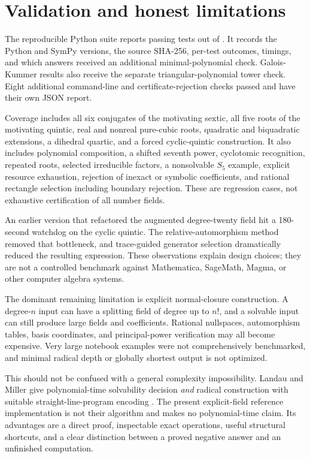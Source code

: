 \documentclass[11pt,a4paper]{article}
\theoremstyle{definition}\newtheorem{definition}[theorem]{Definition}
\theoremstyle{remark}\newtheorem{remark}[theorem]{Remark}
\begin{document}
\section{Validation and honest limitations}
The reproducible Python suite reports \TestPassed{} passing tests out of
\TestCount{}. It records the Python and SymPy versions, the source SHA-256,
per-test outcomes, timings, and which answers received an additional
minimal-polynomial check. Galois-Kummer results also receive the separate
triangular-polynomial tower check. Eight additional command-line and
certificate-rejection checks passed and have their own JSON report.

Coverage includes all six conjugates of the motivating sextic, all five
roots of the motivating quintic, real and nonreal pure-cubic roots, quadratic
and biquadratic extensions, a dihedral quartic, and a forced cyclic-quintic
construction. It also includes polynomial composition, a shifted seventh
power, cyclotomic recognition, repeated roots, selected irreducible factors,
a nonsolvable $S_5$ example, explicit resource exhaustion, rejection of
inexact or symbolic coefficients, and rational rectangle selection including
boundary rejection. These are regression cases, not exhaustive certification
of all number fields.

An earlier version that refactored the augmented degree-twenty field hit a
180-second watchdog on the cyclic quintic. The relative-automorphism method
removed that bottleneck, and trace-guided generator selection dramatically
reduced the resulting expression. These observations explain design choices;
they are not a controlled benchmark against Mathematica, SageMath, Magma,
or other computer algebra systems.

The dominant remaining limitation is explicit normal-closure construction.
A degree-$n$ input can have a splitting field of degree up to $n!$, and a
solvable input can still produce large fields and coefficients. Rational
nullspaces, automorphism tables, basis coordinates, and principal-power
verification may all become expensive. Very large notebook examples were
not comprehensively benchmarked, and minimal radical depth or globally
shortest output is not optimized.

This should not be confused with a general complexity impossibility.
Landau and Miller give polynomial-time solvability decision \emph{and}
radical construction with suitable straight-line-program encoding
\cite{landaumiller}. The present explicit-field reference implementation
is not their algorithm and makes no polynomial-time claim. Its advantages
are a direct proof, inspectable exact operations, useful structural shortcuts,
and a clear distinction between a proved negative answer and an unfinished
computation.
\end{document}
